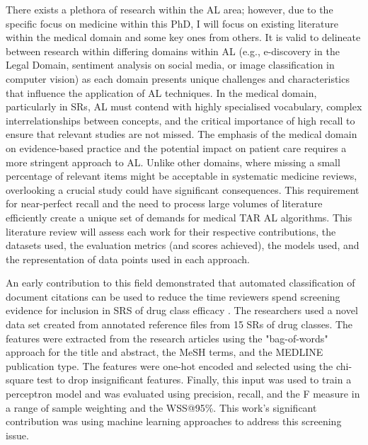 \documentclass[10pt, english]{article}
\begin{document}
There exists a plethora of research within the AL area; however, due to the specific focus on medicine within this PhD, I will focus on existing literature within the medical domain and some key ones from others. It is valid to delineate between research within differing domains within AL (e.g., e-discovery in the Legal Domain, sentiment analysis on social media, or image classification in computer vision) as each domain presents unique challenges and characteristics that influence the application of AL techniques. In the medical domain, particularly in SRs, AL must contend with highly specialised vocabulary, complex interrelationships between concepts, and the critical importance of high recall to ensure that relevant studies are not missed.
The emphasis of the medical domain on evidence-based practice and the potential impact on patient care requires a more stringent approach to AL. Unlike other domains, where missing a small percentage of relevant items might be acceptable in systematic medicine reviews, overlooking a crucial study could have significant consequences. This requirement for near-perfect recall and the need to process large volumes of literature efficiently create a unique set of demands for medical TAR AL algorithms. This literature review will assess each work for their respective contributions, the datasets used, the evaluation metrics (and scores achieved), the models used, and the representation of data points used in each approach.

An early contribution to this field demonstrated that automated classification of document citations can be used to reduce the time reviewers spend screening evidence for inclusion in SRS of drug class efficacy \cite{cohen_reducing_2006}. The researchers used a novel data set created from annotated reference files from 15 SRs of drug classes. The features were extracted from the research articles using the "bag-of-words" approach for the title and abstract, the MeSH terms, and the MEDLINE publication type. The features were one-hot encoded and selected using the chi-square test to drop insignificant features. Finally, this input was used to train a perceptron model and was evaluated using precision, recall, and the F measure in a range of sample weighting and the WSS@95\%. This work's significant contribution was using machine learning approaches to address this screening issue.
\end{document}

